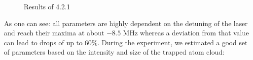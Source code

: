 \documentclass[12pt, a4paper]{article}
\begin{document}
\begin{figure}[h]
\centering
\caption{Results of 4.2.1}
	\label{results_loading}
\end{figure}
\newpage

As one can see: all parameters are highly dependent on the detuning of the laser and reach their maxima at about $-8.5$ MHz whereas a deviation from that value can lead to drops of  up to 60$\%$. During the experiment, we estimated a good set of parameters based on the intensity and size of the trapped atom cloud:
\end{document}
